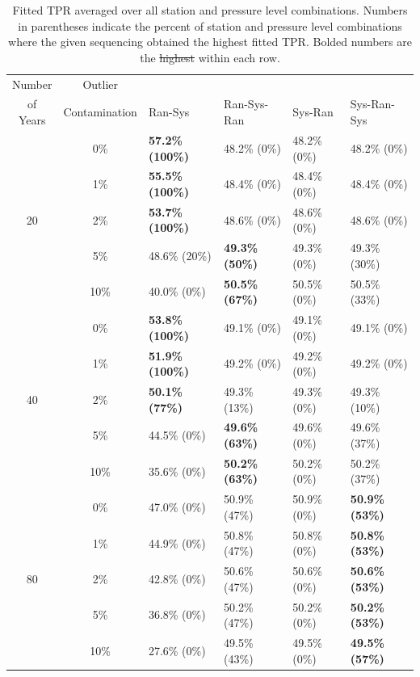 \documentclass[12pt]{article}
\providecommand{\DIFaddtex}[1]{{\protect\color{blue}\uwave{#1}}} %
\providecommand{\DIFdeltex}[1]{{\protect\color{red}\sout{#1}}}                      %
\providecommand{\DIFaddFL}[1]{\DIFadd{#1}} %
\providecommand{\DIFdelFL}[1]{\DIFdel{#1}} %
\providecommand{\DIFaddbeginFL}{} %
\providecommand{\DIFaddendFL}{} %
\providecommand{\DIFdelbeginFL}{} %
\providecommand{\DIFdelendFL}{} %
\providecommand{\DIFadd}[1]{\texorpdfstring{\DIFaddtex{#1}}{#1}} %
\providecommand{\DIFdel}[1]{\texorpdfstring{\DIFdeltex{#1}}{}} %
\begin{document}
\begin{landscape}
\begin{table}[ht]
	\centering
	\begin{tabular}{cc|llll}
	  \hline
	  Number & Outlier & & & &\\
	  of Years & Contamination & Ran-Sys & Ran-Sys-Ran & Sys-Ran & Sys-Ran-Sys\\ 
	  \hline
	  & 0\% & \textbf{57.2\% (100\%)} & 48.2\% (0\%) & 48.2\% (0\%) & 48.2\% (0\%) \\ 
	  & 1\% & \textbf{55.5\% (100\%)} & 48.4\% (0\%) & 48.4\% (0\%) & 48.4\% (0\%) \\ 
	  20 & 2\% & \textbf{53.7\% (100\%)} & 48.6\% (0\%) & 48.6\% (0\%) & 48.6\% (0\%) \\ 
	  & 5\% & 48.6\% (20\%) & \textbf{49.3\% (50\%)} & 49.3\% (0\%) & 49.3\% (30\%) \\ 
	  & 10\% & 40.0\% (0\%) & \textbf{50.5\% (67\%)} & 50.5\% (0\%) & 50.5\% (33\%) \\
	  \hline
	  & 0\% & \textbf{53.8\% (100\%)} & 49.1\% (0\%) & 49.1\% (0\%) & 49.1\% (0\%) \\ 
	  & 1\% & \textbf{51.9\% (100\%)} & 49.2\% (0\%) & 49.2\% (0\%) & 49.2\% (0\%) \\ 
	  40 & 2\% & \textbf{50.1\% (77\%)} & 49.3\% (13\%) & 49.3\% (0\%) & 49.3\% (10\%) \\ 
	  & 5\% & 44.5\% (0\%) & \textbf{49.6\% (63\%)} & 49.6\% (0\%) & 49.6\% (37\%) \\ 
	  & 10\% & 35.6\% (0\%) & \textbf{50.2\% (63\%)} & 50.2\% (0\%) & 50.2\% (37\%) \\ 
	  \hline
	  & 0\% & 47.0\% (0\%) & 50.9\% (47\%) & 50.9\% (0\%) & \textbf{50.9\% (53\%)} \\ 
	  & 1\% & 44.9\% (0\%) & 50.8\% (47\%) & 50.8\% (0\%) & \textbf{50.8\% (53\%)} \\ 
	  80 & 2\% & 42.8\% (0\%) & 50.6\% (47\%) & 50.6\% (0\%) & \textbf{50.6\% (53\%)} \\ 
	  & 5\% & 36.8\% (0\%) & 50.2\% (47\%) & 50.2\% (0\%) & \textbf{50.2\% (53\%)} \\ 
	  & 10\% & 27.6\% (0\%) & 49.5\% (43\%) & 49.5\% (0\%) & \textbf{49.5\% (57\%)} \\ 
	  \hline
	\end{tabular}
	\caption{Fitted TPR averaged over all station and pressure level combinations.  Numbers in parentheses indicate the percent of station and pressure level combinations where the given sequencing obtained the highest fitted TPR. Bolded numbers are the \DIFdelbeginFL \DIFdelFL{highest }\DIFdelendFL \DIFaddbeginFL \DIFaddFL{best }\DIFaddendFL within each row.}
	\label{tab:fitTPR}
\end{table}
\end{landscape}
\end{document}
